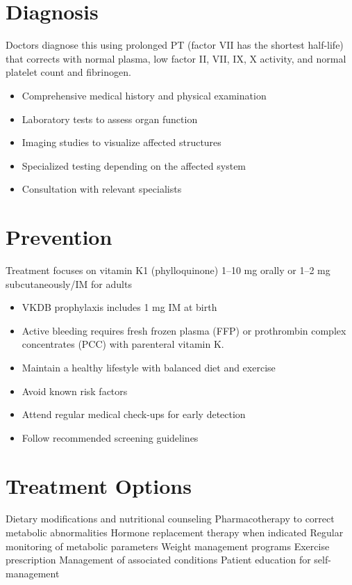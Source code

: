 \section{Diagnosis}
Doctors diagnose this using prolonged PT (factor VII has the shortest half-life) that corrects with normal plasma, low factor II, VII, IX, X activity, and normal platelet count and fibrinogen.

\begin{itemize}[noitemsep]
  \item Comprehensive medical history and physical examination
  \item Laboratory tests to assess organ function
  \item Imaging studies to visualize affected structures
  \item Specialized testing depending on the affected system
  \item Consultation with relevant specialists
\end{itemize}
\section{Prevention}
Treatment focuses on vitamin K1 (phylloquinone) 1--10 mg orally or 1--2 mg subcutaneously/IM for adults

\begin{itemize}[noitemsep]
  \item VKDB prophylaxis includes 1 mg IM at birth
  \item Active bleeding requires fresh frozen plasma (FFP) or prothrombin complex concentrates (PCC) with parenteral vitamin K.
  \item Maintain a healthy lifestyle with balanced diet and exercise
  \item Avoid known risk factors
  \item Attend regular medical check-ups for early detection
  \item Follow recommended screening guidelines
\end{itemize}
\section{Treatment Options}
Dietary modifications and nutritional counseling Pharmacotherapy to correct metabolic abnormalities Hormone replacement therapy when indicated Regular monitoring of metabolic parameters Weight management programs Exercise prescription Management of associated conditions Patient education for self-management

